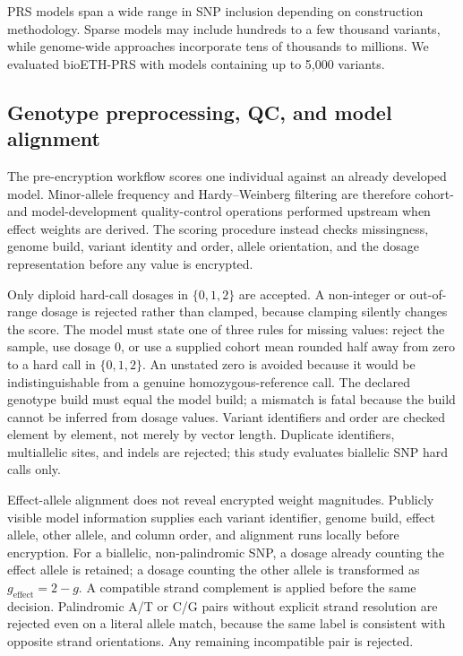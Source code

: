 \documentclass[10pt]{article}
\begin{document}
PRS models span a wide range in SNP inclusion depending on construction methodology.
Sparse models may include hundreds to a few thousand variants, while genome-wide
approaches incorporate tens of thousands to millions.  We evaluated bioETH-PRS with
models containing up to 5,000 variants.

\subsection{Genotype preprocessing, QC, and model alignment}
\label{sec:preprocessing}

The pre-encryption workflow scores one individual against an already developed model.  Minor-allele
frequency and Hardy--Weinberg filtering are therefore cohort- and model-development
quality-control operations performed upstream when effect weights are derived.  The
scoring procedure instead checks missingness, genome build, variant identity and
order, allele orientation, and the dosage representation before any value is encrypted.

Only diploid hard-call dosages in $\{0,1,2\}$ are accepted.  A non-integer or
out-of-range dosage is rejected rather than clamped, because clamping silently changes
the score.  The model must state one of three rules for missing values: reject the
sample, use dosage 0, or use a supplied cohort mean rounded half away from zero to a
hard call in $\{0,1,2\}$.  An unstated zero is avoided because it would be
indistinguishable from a genuine homozygous-reference call.
The declared genotype build must equal the model build; a mismatch is fatal because the
build cannot be inferred from dosage values.  Variant identifiers and order are checked
element by element, not merely by vector length.  Duplicate identifiers, multiallelic
sites, and indels are rejected; this study evaluates biallelic SNP hard calls only.

Effect-allele alignment does not reveal encrypted weight magnitudes.  Publicly visible model
information supplies each variant identifier, genome build, effect allele, other allele,
and column order, and alignment runs locally before encryption.  For a biallelic,
non-palindromic SNP, a dosage already counting the effect allele is retained; a dosage
counting the other allele is transformed as $g_{\mathrm{effect}}=2-g$.  A compatible
strand complement is applied before the same decision.  Palindromic A/T or C/G pairs
without explicit strand resolution are rejected even on a literal allele match, because
the same label is consistent with opposite strand orientations.  Any remaining
incompatible pair is rejected.
\end{document}
